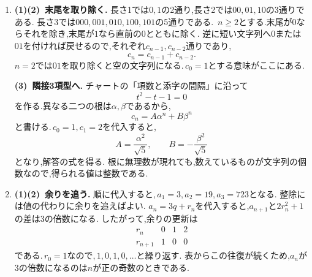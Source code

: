 \begin{enumerate}[label=\textbf{問\arabic*.},leftmargin=3.8em,format=\bookitemlink{practice-bridge}{solution}{problem}]
                \smallskip
                \textbf{(2)(3)~定数を引いて等比型へ.}
                定数の解$\displaystyle \frac12$を引いて付加項を消すと,
                \[
                  p_{n+1}-\frac12
                   =-\frac13\left(p_n-\frac12\right).
                \]
                初期値$\displaystyle p_0=1$より,
                \[
                  p_n-\frac12=\frac12\left(-\frac13\right)^n.
                \]
                公比の絶対値が$\displaystyle 1$未満だからは$\displaystyle \frac12$となる.
                「偶数か奇数か」だけを記録すれば,赤の正確な個数をすべて追う必要はない.
          \item \textbf{(1)(2)~末尾を取り除く.}
                長さ1では$\displaystyle 0,1$の2通り,長さ2では$\displaystyle 00,01,10$の3通りである.
                長さ3では\BookMathLayout{}{\newline}$\displaystyle 000,001,010,100,101$の5通りである.\,
                $\displaystyle n\ge2$とする.末尾が$0$ならそれを除き,末尾が$1$なら直前の$0$とともに除く.
                逆に短い文字列へ$0$または$01$を付ければ戻せるので,それぞれ$c_{n-1},c_{n-2}$通りであり,
                \[
                  c_n=c_{n-1}+c_{n-2}.
                \]
                $\displaystyle n=2$では$\displaystyle 01$を取り除くと空の文字列になる.\,$\displaystyle c_0=1$とする意味がここにある.

                \smallskip
                \textbf{(3)~隣接3項型へ.}
                チャートの「項数と添字の間隔」に沿って
                \[
                  t^2-t-1=0
                \]
                を作る.異なる二つの根は$\displaystyle \alpha,\beta$であるから,
                \[
                  c_n=A\alpha^n+B\beta^n
                \]
                と書ける.\,$\displaystyle c_0=1,c_1=2$を代入すると,
                \[
                  A=\frac{\alpha^2}{\sqrt5},\qquad
                  B=-\frac{\beta^2}{\sqrt5}
                \]
                となり,解答の式を得る.
                根に無理数が現れても,数えているものが文字列の個数なので,得られる値は整数である.
          \item \textbf{(1)(2)~余りを追う.}
                順に代入すると,\,$\displaystyle a_1=3,a_2=19,a_3=723$となる.
                整除には値の代わりに余りを追えばよい.
                $a_n=3q+r_n$を代入すると,$a_{n+1}$と$2r_n^2+1$の差は$3$の倍数になる.
                したがって,余りの更新は
                \[
                  \begin{array}{c|ccc}
                    r_n&0&1&2\\ \hline
                    r_{n+1}&1&0&0
                  \end{array}
                \]
                である.\,$\displaystyle r_0=1$なので,\,$\displaystyle 1,0,1,0,\ldots$と繰り返す.
                表からこの往復が続くため,$a_n$が$3$の倍数になるのは$n$が正の奇数のときである.


\end{enumerate}
